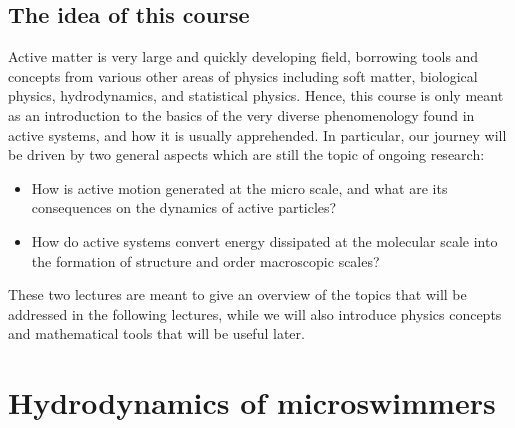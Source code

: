 
\subsection{The idea of this course}

Active matter is very large and quickly developing field, borrowing tools and concepts from various other areas of physics including soft matter, biological physics, hydrodynamics, and statistical physics. Hence, this course is only meant as an introduction to the basics of the very diverse phenomenology found in active systems, and how it is usually apprehended. In particular, our journey will be driven by two general aspects which are still the topic of ongoing research:
\begin{itemize}
    \item How is active motion generated at the micro scale, and what are its consequences on the dynamics of active particles?
    \item How do active systems convert energy dissipated at the molecular scale into the formation of structure and order macroscopic scales?
\end{itemize}
These two lectures are meant to give an overview of the topics that will be addressed in the following lectures, while we will also introduce physics concepts and mathematical tools that will be useful later.


\section{Hydrodynamics of microswimmers}

